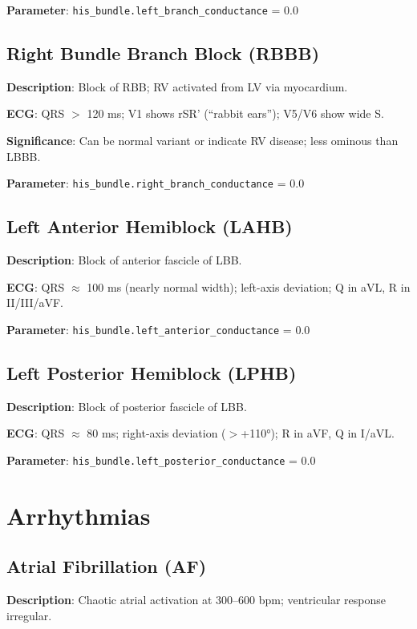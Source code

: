 \documentclass[12pt,oneside,a4paper]{book}
\newcommand{\code}[1]{\texttt{#1}}
\begin{document}
\textbf{Parameter}: \code{his\_bundle.left\_branch\_conductance} = 0.0

\subsection{Right Bundle Branch Block (RBBB)}

\textbf{Description}: Block of RBB; RV activated from LV via myocardium.

\textbf{ECG}: QRS $>$ 120 ms; V1 shows rSR' (``rabbit ears''); V5/V6 show wide S.

\textbf{Significance}: Can be normal variant or indicate RV disease; less ominous than LBBB.

\textbf{Parameter}: \code{his\_bundle.right\_branch\_conductance} = 0.0

\subsection{Left Anterior Hemiblock (LAHB)}

\textbf{Description}: Block of anterior fascicle of LBB.

\textbf{ECG}: QRS $\approx$ 100 ms (nearly normal width); left-axis deviation; Q in aVL, R in II/III/aVF.

\textbf{Parameter}: \code{his\_bundle.left\_anterior\_conductance} = 0.0

\subsection{Left Posterior Hemiblock (LPHB)}

\textbf{Description}: Block of posterior fascicle of LBB.

\textbf{ECG}: QRS $\approx$ 80 ms; right-axis deviation ($>$+110°); R in aVF, Q in I/aVL.

\textbf{Parameter}: \code{his\_bundle.left\_posterior\_conductance} = 0.0

\section{Arrhythmias}

\subsection{Atrial Fibrillation (AF)}

\textbf{Description}: Chaotic atrial activation at 300--600 bpm; ventricular response irregular.
\end{document}
